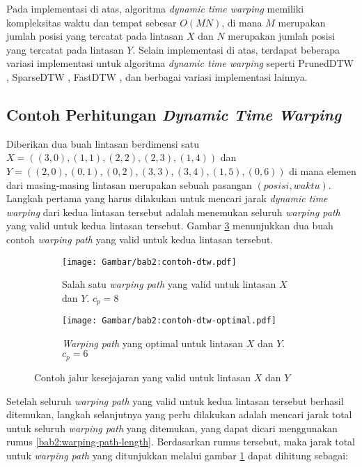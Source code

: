 Pada implementasi di atas, algoritma \textit{dynamic time warping} memiliki kompleksitas waktu dan tempat sebesar $O(MN)$, di mana $M$ merupakan jumlah posisi yang tercatat pada lintasan $X$ dan $N$ merupakan jumlah posisi yang tercatat pada lintasan $Y$. Selain implementasi di atas, terdapat beberapa variasi implementasi untuk algoritma \textit{dynamic time warping} seperti PrunedDTW \cite{diego:02:pruned-dtw}, SparseDTW \cite{ghazi:02:sparse-dtw}, FastDTW \cite{salvador:02:fast-dtw}, dan berbagai variasi implementasi lainnya.

\subsection{Contoh Perhitungan \textit{Dynamic Time Warping}}
\label{subsec:contoh-dtw}

Diberikan dua buah lintasan berdimensi satu $X = ((3, 0), (1, 1), (2, 2), (2, 3), (1, 4))$ dan $Y = ((2, 0), (0, 1), (0, 2), (3, 3), (3, 4), (1, 5), (0, 6))$ di mana elemen dari masing-masing lintasan merupakan sebuah pasangan $(posisi, waktu)$. Langkah pertama yang harus dilakukan untuk mencari jarak \textit{dynamic time warping} dari kedua lintasan tersebut adalah menemukan seluruh \textit{warping path} yang valid untuk kedua lintasan tersebut. Gambar \ref{bab2:contoh-dtw} menunjukkan dua buah contoh \textit{warping path} yang valid untuk kedua lintasan tersebut.

\begin{figure}[h]
    \centering
    \begin{subfigure}{0.25\textwidth}
        \centering
        \texttt{[image: Gambar/bab2:contoh-dtw.pdf]}
        \caption{Salah satu \textit{warping path} yang valid untuk lintasan $X$ dan $Y$. $c_p = 8$}
        \label{bab2:warping-path}
    \end{subfigure} \hspace{1cm}
    \begin{subfigure}{0.25\textwidth}
        \centering
        \texttt{[image: Gambar/bab2:contoh-dtw-optimal.pdf]}
        \caption{\textit{Warping path} yang optimal untuk lintasan $X$ dan $Y$. $c_p = 6$}
        \label{bab2:warping-path-optimal}
    \end{subfigure}
    \caption{Contoh jalur kesejajaran yang valid untuk lintasan $X$ dan $Y$}
    \label{bab2:contoh-dtw}
\end{figure}

Setelah seluruh \textit{warping path} yang valid untuk kedua lintasan tersebut berhasil ditemukan, langkah selanjutnya yang perlu dilakukan adalah mencari jarak total untuk seluruh \textit{warping path} yang ditemukan, yang dapat dicari menggunakan rumus \ref{bab2:warping-path-length}. Berdasarkan rumus tersebut, maka jarak total untuk \textit{warping path} yang ditunjukkan melalui gambar \ref{bab2:warping-path} dapat dihitung sebagai:

